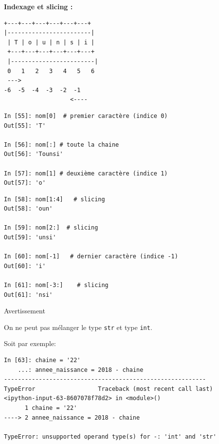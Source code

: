 \documentclass{beamer}
\begin{document}
\begin{frame}

\noindent\textbf{Indexage et slicing :}

\begin{Verbatim}[numbers=none,fontsize=\fontsize{9pt}{9pt},baselinestretch=0.95]
 +---+---+---+---+---+---+
|------------------------|
 | T | o | u | n | s | i |
 +---+---+---+---+---+---+
 |------------------------|
 0   1   2   3   4   5   6
 --->
-6  -5  -4  -3  -2  -1
                   <----
\end{Verbatim}
\begin{verbatim}
In [55]: nom[0]  # premier caractère (indice 0)
Out[55]: 'T'

In [56]: nom[:] # toute la chaine
Out[56]: 'Tounsi'

In [57]: nom[1] # deuxième caractère (indice 1)
Out[57]: 'o'
\end{verbatim}
\end{frame}

\begin{frame}

\begin{verbatim}
In [58]: nom[1:4]   # slicing
Out[58]: 'oun'

In [59]: nom[2:]  # slicing
Out[59]: 'unsi'

In [60]: nom[-1]   # dernier caractère (indice -1)
Out[60]: 'i'

In [61]: nom[-3:]    # slicing
Out[61]: 'nsi'

\end{verbatim}
\end{frame}

\begin{frame}

\begin{block}{Avertissement}

On ne peut pas mélanger le type \texttt{str} et type \texttt{int}.

Soit par exemple:
\begin{verbatim}
In [63]: chaine = '22'
    ...: annee_naissance = 2018 - chaine
----------------------------------------------------------
TypeError                  Traceback (most recent call last)
<ipython-input-63-8607078f78d2> in <module>()
      1 chaine = '22'
----> 2 annee_naissance = 2018 - chaine

TypeError: unsupported operand type(s) for -: 'int' and 'str'
\end{verbatim}
\end{block}
\end{frame}
\end{document}

